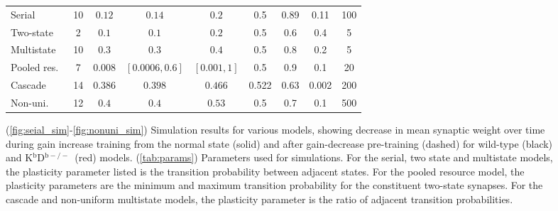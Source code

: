 \documentclass[10pt]{article}
\newcommand{\KO}{K$^\mathrm{b}$D$^{\mathrm{b}-/-}$}
\begin{document}
\begin{figure}[p]
\begin{myenuma}
{\begin{tabular}{|l|c|c|c|c|c|c|c|c|}
    \cline{1-9}
    Serial   & 10 & $0.12$  & $0.14$  & $0.2$  & 0.5 & 0.89 & 0.11  & 100  \\%
    Two-state     & 2  & $0.1$  & $0.1$  & $0.2$  & 0.5 & 0.6 & 0.4  & 5   \\%
    Multistate    & 10 & $0.3$  & $0.3$  & $0.4$  & 0.5 & 0.8 & 0.2  & 5   \\%
    Pooled res.\ & 7  & $0.008$        & $[0.0006,0.6]$  & $[0.001,1]$
                                          & 0.5 & 0.9 & 0.1 & 20 \\%
    Cascade  & 14 & $0.386$  & $0.398$  & $0.466$  & 0.522 & 0.63 & 0.002  & 200  \\%
    Non-uni.\ & 12 & $0.4$    & $0.4$    & $0.53$   & 0.5 & 0.7 & 0.1 & 500  \\%
    \cline{1-9}
  \end{tabular}}
  \end{myenuma}
  \caption[Simulation results for various models]{(\ref{fig:seial_sim}-\ref{fig:nonuni_sim}) Simulation results for various models, showing decrease in mean synaptic weight over time during gain increase training from the normal state (solid) and after gain-decrease pre-training (dashed) for wild-type (black) and \KO\ (red) models.
  (\ref{tab:params}) Parameters used for simulations.
  For the serial, two state and multistate models, the plasticity parameter listed is the transition probability between adjacent states.
  For the pooled resource model, the plasticity parameters are the minimum and maximum transition probability for the constituent two-state synapses.
  For the cascade and non-uniform multistate models, the plasticity parameter is the ratio of adjacent transition probabilities.}\label{fig:sim_results}
\end{figure}
\end{document}
